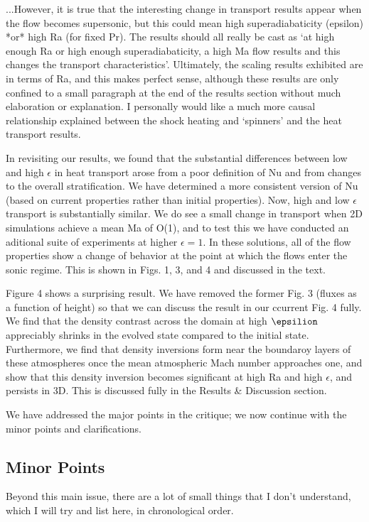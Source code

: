 \documentclass[aps, 11pt, singlecolumn]{revtex4-1} %
\begin{document}
\begin{singlespace}
\begin{myquotation}
...However, it is true that the
interesting change in transport results appear when the flow becomes
supersonic, but this could mean high superadiabaticity (epsilon) *or*
high Ra (for fixed Pr). The results should all really be cast as
`at high enough Ra or high enough superadiabaticity, a high Ma flow
results and this changes the transport characteristics'.
Ultimately, the scaling results exhibited are in terms of Ra, and this
makes perfect sense, although these results are only confined to a
small paragraph at the end of the results section without much
elaboration or explanation. I personally would like a much more causal
relationship explained between the shock heating and `spinners'
and the heat transport results.
\end{myquotation}
In revisiting our results, we found that the substantial differences between
low and high $\epsilon$ in heat transport arose from a poor definition of
Nu and from changes to the overall stratification.  We have determined a
more consistent version of Nu (based on current properties rather than initial
properties).  Now, high and low $\epsilon$ transport is substantially similar.
We do see a small change in transport when 2D simulations achieve a mean
Ma of O(1), and to test this we have conducted an aditional suite of
experiments at higher $\epsilon = 1$.  In these solutions, all of the flow
properties show a change of behavior at the point at which the flows enter the
sonic regime.  This is shown in Figs. 1, 3, and 4 and discussed in the text.

Figure 4 shows a surprising result.  We have removed the former Fig. 3 (fluxes
as a function of height) so that we can discuss the result in our ccurrent
Fig. 4 fully.  We find that the density contrast across the domain at high $\epsilion$
appreciably shrinks in the evolved state compared to the initial state.  Furthermore, we find
that density inversions form near the boundaroy layers of these atmospheres once the mean atmospheric Mach number approaches
one, and show that this density inversion becomes significant at high Ra and high $\epsilon$,
and persists in 3D.  This is discussed fully in the Results \& Discussion section.

We have addressed the major points in the critique; we now continue with the
minor points and clarifications.



\subsection{Minor Points}
\begin{myquotation}
Beyond this main issue, there are a lot of small things that I don't
understand, which I will try and list here, in chronological order.


\end{myquotation}
\end{singlespace}
\end{document}
